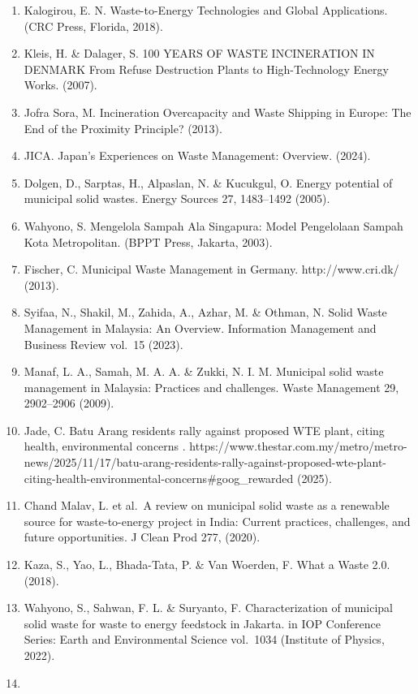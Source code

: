\documentclass[
  letterpaper,
  DIV=11,
  numbers=noendperiod]{scrreprt}
\begin{document}
\begin{enumerate}
  Sustainability (Switzerland) 12, 1--12 (2020).
\item
  Kalogirou, E. N. Waste-to-Energy Technologies and Global Applications.
  (CRC Press, Florida, 2018).
\item
  Kleis, H. \& Dalager, S. 100 YEARS OF WASTE INCINERATION IN DENMARK
  From Refuse Destruction Plants to High-Technology Energy Works.
  (2007).
\item
  Jofra Sora, M. Incineration Overcapacity and Waste Shipping in Europe:
  The End of the Proximity Principle? (2013).
\item
  JICA. Japan's Experiences on Waste Management: Overview. (2024).
\item
  Dolgen, D., Sarptas, H., Alpaslan, N. \& Kucukgul, O. Energy potential
  of municipal solid wastes. Energy Sources 27, 1483--1492 (2005).
\item
  Wahyono, S. Mengelola Sampah Ala Singapura: Model Pengelolaan Sampah
  Kota Metropolitan. (BPPT Press, Jakarta, 2003).
\item
  Fischer, C. Municipal Waste Management in Germany. http://www.cri.dk/
  (2013).
\item
  Syifaa, N., Shakil, M., Zahida, A., Azhar, M. \& Othman, N. Solid
  Waste Management in Malaysia: An Overview. Information Management and
  Business Review vol.~15 (2023).
\item
  Manaf, L. A., Samah, M. A. A. \& Zukki, N. I. M. Municipal solid waste
  management in Malaysia: Practices and challenges. Waste Management 29,
  2902--2906 (2009).
\item
  Jade, C. Batu Arang residents rally against proposed WTE plant, citing
  health, environmental concerns .
  https://www.thestar.com.my/metro/metro-news/2025/11/17/batu-arang-residents-rally-against-proposed-wte-plant-citing-health-environmental-concerns\#goog\_rewarded
  (2025).
\item
  Chand Malav, L. et al.~A review on municipal solid waste as a
  renewable source for waste-to-energy project in India: Current
  practices, challenges, and future opportunities. J Clean Prod 277,
  (2020).
\item
  Kaza, S., Yao, L., Bhada-Tata, P. \& Van Woerden, F. What a Waste 2.0.
  (2018).
\item
  Wahyono, S., Sahwan, F. L. \& Suryanto, F. Characterization of
  municipal solid waste for waste to energy feedstock in Jakarta. in IOP
  Conference Series: Earth and Environmental Science vol.~1034
  (Institute of Physics, 2022).
\item

\end{enumerate}
\end{document}

